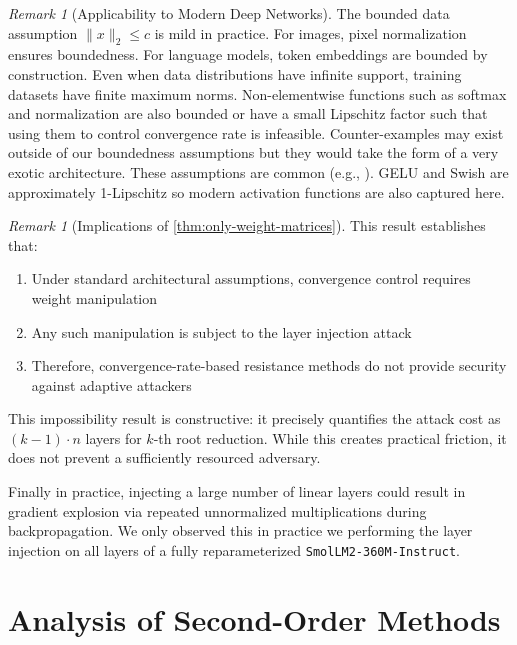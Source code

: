 \documentclass{article}
\theoremstyle{plain}
\theoremstyle{definition}
\theoremstyle{remark}
\newtheorem{remark}[theorem]{Remark}
\begin{document}
\begin{remark}[Applicability to Modern Deep Networks]
\label{app:applicability-impossiblity-result-to-modern-deep-networks}
The bounded data assumption $\|x\|_2 \leq c$ is mild in practice. For 
images, pixel normalization ensures boundedness. For language models, 
token embeddings are bounded by construction. Even when data distributions 
have infinite support, training datasets have finite maximum norms.
Non-elementwise functions such as softmax and normalization are also bounded or have a small Lipschitz factor such that using them to control convergence rate is infeasible. Counter-examples may exist outside of our boundedness assumptions but they would take the form of a very exotic architecture. These assumptions are common (e.g., \citealp{du2019gradient, xiong2020layer}). GELU and Swish are approximately 1-Lipschitz so modern activation functions are also captured here.
\end{remark}

\begin{remark}[Implications of \cref{thm:only-weight-matrices}]
This result establishes that:
\begin{enumerate}
\item Under standard architectural assumptions, convergence control requires 
    weight manipulation
\item Any such manipulation is subject to the layer injection attack 
\item Therefore, convergence-rate-based resistance methods do not provide security 
    against adaptive attackers
\end{enumerate}
This impossibility result is constructive: it precisely quantifies the 
attack cost as $(k-1) \cdot n$ layers for $k$-th root reduction. While 
this creates practical friction, it 
does not prevent a sufficiently resourced adversary.
\end{remark}

Finally in practice, injecting a large number of linear layers could result in gradient explosion via repeated unnormalized multiplications during backpropagation. We only observed this in practice we performing the layer injection on all layers of a fully reparameterized \texttt{SmolLM2-360M-Instruct}.

\section{Analysis of Second-Order Methods}
\label{app:second-order-analysis}
\end{document}
